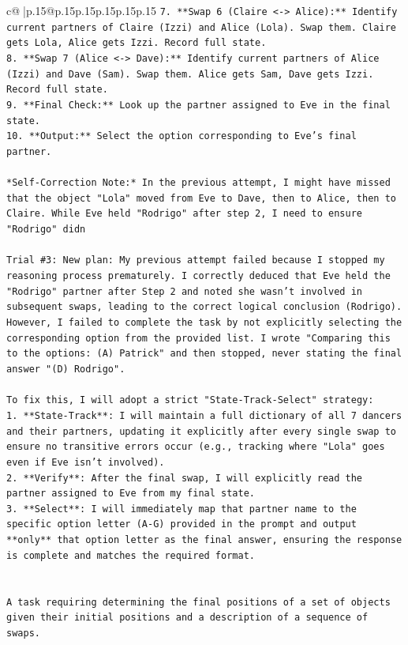 \documentclass{article}
\begin{document}
{\begin{supertabular}{c@{$\;$}|p{.15\linewidth}@{}p{.15\linewidth}p{.15\linewidth}p{.15\linewidth}p{.15\linewidth}p{.15\linewidth}}
{{{\texttt{7.  **Swap 6 (Claire <{-}> Alice):** Identify current partners of Claire (Izzi) and Alice (Lola). Swap them. Claire gets Lola, Alice gets Izzi. Record full state.} \\
\texttt{8.  **Swap 7 (Alice <{-}> Dave):** Identify current partners of Alice (Izzi) and Dave (Sam). Swap them. Alice gets Sam, Dave gets Izzi. Record full state.} \\
\texttt{9.  **Final Check:** Look up the partner assigned to Eve in the final state.} \\
\texttt{10. **Output:** Select the option corresponding to Eve's final partner.} \\
\\ 
\texttt{*Self{-}Correction Note:* In the previous attempt, I might have missed that the object "Lola" moved from Eve to Dave, then to Alice, then to Claire. While Eve held "Rodrigo" after step 2, I need to ensure "Rodrigo" didn} \\
\\ 
\texttt{Trial \#3: New plan: My previous attempt failed because I stopped my reasoning process prematurely. I correctly deduced that Eve held the "Rodrigo" partner after Step 2 and noted she wasn't involved in subsequent swaps, leading to the correct logical conclusion (Rodrigo). However, I failed to complete the task by not explicitly selecting the corresponding option from the provided list. I wrote "Comparing this to the options: (A) Patrick" and then stopped, never stating the final answer "(D) Rodrigo".} \\
\\ 
\texttt{To fix this, I will adopt a strict "State{-}Track{-}Select" strategy:} \\
\texttt{1.  **State{-}Track**: I will maintain a full dictionary of all 7 dancers and their partners, updating it explicitly after every single swap to ensure no transitive errors occur (e.g., tracking where "Lola" goes even if Eve isn't involved).} \\
\texttt{2.  **Verify**: After the final swap, I will explicitly read the partner assigned to Eve from my final state.} \\
\texttt{3.  **Select**: I will immediately map that partner name to the specific option letter (A{-}G) provided in the prompt and output **only** that option letter as the final answer, ensuring the response is complete and matches the required format.} \\
\\ 
\\ 
\texttt{A task requiring determining the final positions of a set of objects given their initial positions and a description of a sequence of swaps.} \\
}}}
\end{supertabular}}
\end{document}
